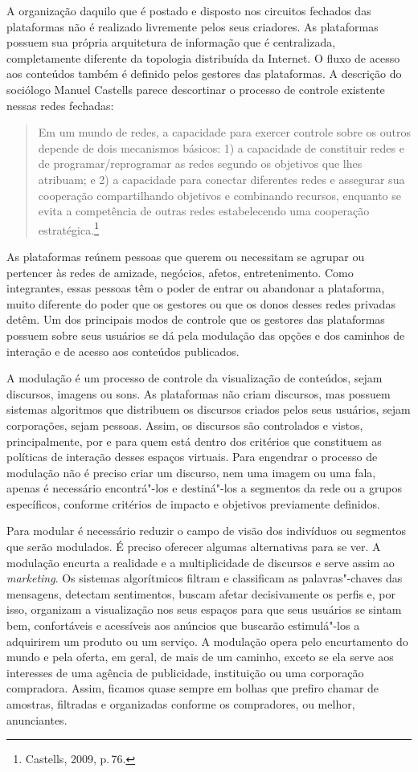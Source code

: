 A organização daquilo que é postado e disposto nos circuitos fechados
das plataformas não é realizado livremente pelos seus criadores. As
plataformas possuem sua própria arquitetura de informação que é
centralizada, completamente diferente da topologia distribuída da
Internet. O fluxo de acesso aos conteúdos também é definido pelos
gestores das plataformas. A descrição do sociólogo Manuel Castells
parece descortinar o processo de controle existente nessas redes
fechadas:

\begin{quote}
Em um mundo de redes, a capacidade para exercer controle sobre os outros
depende de dois mecanismos básicos: 1) a capacidade de constituir redes
e de programar/reprogramar as redes segundo os objetivos que lhes
atribuam; e 2) a capacidade para conectar diferentes redes e assegurar
sua cooperação compartilhando objetivos e combinando recursos, enquanto
se evita a competência de outras redes estabelecendo uma cooperação
estratégica.\footnote{Castells, 2009, p.\,76.}
\end{quote}

As plataformas reúnem pessoas que querem ou necessitam se agrupar ou
pertencer às redes de amizade, negócios, afetos, entretenimento. Como
integrantes, essas pessoas têm o poder de entrar ou abandonar a
plataforma, muito diferente do poder que os gestores ou que os donos
desses redes privadas detêm. Um dos principais modos de controle que os
gestores das plataformas possuem sobre seus usuários se dá pela
modulação das opções e dos caminhos de interação e de acesso aos
conteúdos publicados.

A modulação é um processo de controle da visualização de conteúdos,
sejam discursos, imagens ou sons. As plataformas não criam discursos,
mas possuem sistemas algoritmos que distribuem os discursos criados
pelos seus usuários, sejam corporações, sejam pessoas. Assim, os
discursos são controlados e vistos, principalmente, por e para quem está
dentro dos critérios que constituem as políticas de interação desses
espaços virtuais. Para engendrar o processo de modulação não é preciso
criar um discurso, nem uma imagem ou uma fala, apenas é necessário
encontrá"-los e destiná"-los a segmentos da rede ou a grupos específicos,
conforme critérios de impacto e objetivos previamente definidos.

Para modular é necessário reduzir o campo de visão dos indivíduos ou
segmentos que serão modulados. É preciso oferecer algumas alternativas
para se ver. A modulação encurta a realidade e a multiplicidade de
discursos e serve assim ao \emph{marketing}. Os sistemas algorítmicos filtram e
classificam as palavras"-chaves das mensagens, detectam sentimentos,
buscam afetar decisivamente os perfis e, por isso, organizam a
visualização nos seus espaços para que seus usuários se sintam bem,
confortáveis e acessíveis aos anúncios que buscarão estimulá"-los a
adquirirem um produto ou um serviço. A modulação opera pelo encurtamento
do mundo e pela oferta, em geral, de mais de um caminho, exceto se ela
serve aos interesses de uma agência de publicidade, instituição ou uma
corporação compradora. Assim, ficamos quase sempre em bolhas que prefiro
chamar de amostras, filtradas e organizadas conforme os compradores, ou
melhor, anunciantes.

